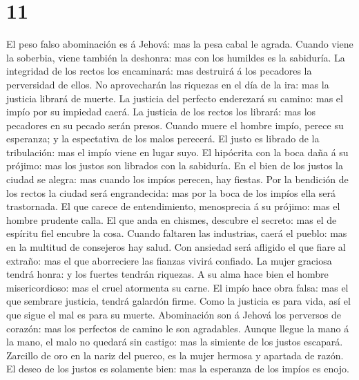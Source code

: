 \hypertarget{section-10}{%
\section{11}\label{section-10}}

 El peso falso abominación es á Jehová: mas la pesa cabal
le agrada.  Cuando viene la soberbia, viene también la
deshonra: mas con los humildes es la sabiduría.  La
integridad de los rectos los encaminará: mas destruirá á los pecadores
la perversidad de ellos.  No aprovecharán las riquezas en
el día de la ira: mas la justicia librará de muerte.  La
justicia del perfecto enderezará su camino: mas el impío por su impiedad
caerá.  La justicia de los rectos los librará: mas los
pecadores en su pecado serán presos.  Cuando muere el
hombre impío, perece su esperanza; y la espectativa de los malos
perecerá.  El justo es librado de la tribulación: mas el
impío viene en lugar suyo.  El hipócrita con la boca daña
á su prójimo: mas los justos son librados con la sabiduría.
 En el bien de los justos la ciudad se alegra: mas cuando
los impíos perecen, hay fiestas.  Por la bendición de los
rectos la ciudad será engrandecida: mas por la boca de los impíos ella
será trastornada.  El que carece de entendimiento,
menosprecia á su prójimo: mas el hombre prudente calla. 
El que anda en chismes, descubre el secreto: mas el de espíritu fiel
encubre la cosa.  Cuando faltaren las industrias, caerá
el pueblo: mas en la multitud de consejeros hay salud. 
Con ansiedad será afligido el que fiare al extraño: mas el que
aborreciere las fianzas vivirá confiado.  La mujer
graciosa tendrá honra: y los fuertes tendrán riquezas.  A
su alma hace bien el hombre misericordioso: mas el cruel atormenta su
carne.  El impío hace obra falsa: mas el que sembrare
justicia, tendrá galardón firme.  Como la justicia es
para vida, así el que sigue el mal es para su muerte. 
Abominación son á Jehová los perversos de corazón: mas los perfectos de
camino le son agradables.  Aunque llegue la mano á la
mano, el malo no quedará sin castigo: mas la simiente de los justos
escapará.  Zarcillo de oro en la nariz del puerco, es la
mujer hermosa y apartada de razón.  El deseo de los
justos es solamente bien: mas la esperanza de los impíos es enojo.
